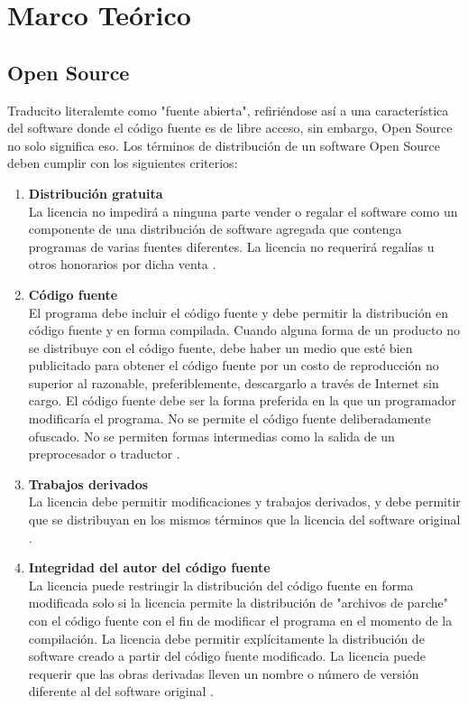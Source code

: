 \chapter{Marco Teórico} \label{chapter:II}
\begin{spacing}{1.5}
\section{Open Source}
		Traducito literalemte como "fuente abierta", refiri\'{e}ndose as\'{i} a una caracter\'{i}stica del software donde el c\'{o}digo fuente es de libre acceso, sin embargo, Open Source no solo significa eso. Los t\'{e}rminos de distribuci\'{o}n de un software Open Source deben cumplir con los siguientes criterios:

		\begin{enumerate}
			\item \textbf{Distribuci\'{o}n gratuita}\\
			La licencia no impedirá a ninguna parte vender o regalar el software como un componente de una distribución de software agregada que contenga programas de varias fuentes diferentes. La licencia no requerirá regalías u otros honorarios por dicha venta \cite{chap2_open_source}.
			
			\item \textbf{C\'{o}digo fuente}\\
			El programa debe incluir el código fuente y debe permitir la distribución en código fuente y en forma compilada. Cuando alguna forma de un producto no se distribuye con el código fuente, debe haber un medio que est\'{e} bien publicitado para obtener el código fuente por un costo de reproducción no superior al razonable, preferiblemente, descargarlo a través de Internet sin cargo. El código fuente debe ser la forma preferida en la que un programador modificaría el programa. No se permite el código fuente deliberadamente ofuscado. No se permiten formas intermedias como la salida de un preprocesador o traductor \cite{chap2_open_source}.

			\item \textbf{Trabajos derivados}\\
			La licencia debe permitir modificaciones y trabajos derivados, y debe permitir que se distribuyan en los mismos términos que la licencia del software original \cite{chap2_open_source}.
			
			\item \textbf{Integridad del autor del c\'{o}digo fuente}\\
			La licencia puede restringir la distribución del código fuente en forma modificada solo si la licencia permite la distribución de "archivos de parche" con el código fuente con el fin de modificar el programa en el momento de la compilación. La licencia debe permitir explícitamente la distribución de software creado a partir del código fuente modificado. La licencia puede requerir que las obras derivadas lleven un nombre o número de versión diferente al del software original \cite{chap2_open_source}.
			

\end{enumerate}
\end{spacing}
